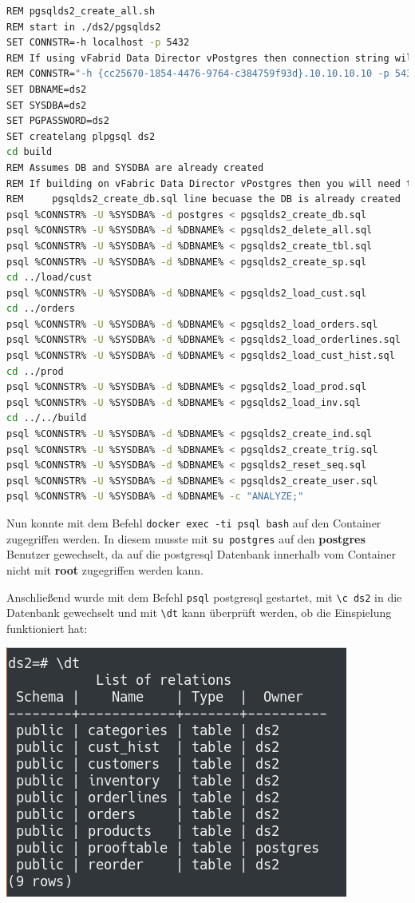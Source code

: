 \begin{lstlisting}[language=bash]
REM pgsqlds2_create_all.sh
REM start in ./ds2/pgsqlds2
SET CONNSTR=-h localhost -p 5432
REM If using vFabrid Data Director vPostgres then connection string will look like this
REM CONNSTR="-h {cc25670-1854-4476-9764-c384759f93d}.10.10.10.10 -p 5432"
SET DBNAME=ds2
SET SYSDBA=ds2
SET PGPASSWORD=ds2
SET createlang plpgsql ds2
cd build
REM Assumes DB and SYSDBA are already created
REM If building on vFabric Data Director vPostgres then you will need to comment out
REM     pgsqlds2_create_db.sql line becuase the DB is already created
psql %CONNSTR% -U %SYSDBA% -d postgres < pgsqlds2_create_db.sql
psql %CONNSTR% -U %SYSDBA% -d %DBNAME% < pgsqlds2_delete_all.sql
psql %CONNSTR% -U %SYSDBA% -d %DBNAME% < pgsqlds2_create_tbl.sql
psql %CONNSTR% -U %SYSDBA% -d %DBNAME% < pgsqlds2_create_sp.sql
cd ../load/cust
psql %CONNSTR% -U %SYSDBA% -d %DBNAME% < pgsqlds2_load_cust.sql
cd ../orders
psql %CONNSTR% -U %SYSDBA% -d %DBNAME% < pgsqlds2_load_orders.sql 
psql %CONNSTR% -U %SYSDBA% -d %DBNAME% < pgsqlds2_load_orderlines.sql 
psql %CONNSTR% -U %SYSDBA% -d %DBNAME% < pgsqlds2_load_cust_hist.sql 
cd ../prod
psql %CONNSTR% -U %SYSDBA% -d %DBNAME% < pgsqlds2_load_prod.sql 
psql %CONNSTR% -U %SYSDBA% -d %DBNAME% < pgsqlds2_load_inv.sql 
cd ../../build
psql %CONNSTR% -U %SYSDBA% -d %DBNAME% < pgsqlds2_create_ind.sql
psql %CONNSTR% -U %SYSDBA% -d %DBNAME% < pgsqlds2_create_trig.sql
psql %CONNSTR% -U %SYSDBA% -d %DBNAME% < pgsqlds2_reset_seq.sql
psql %CONNSTR% -U %SYSDBA% -d %DBNAME% < pgsqlds2_create_user.sql
psql %CONNSTR% -U %SYSDBA% -d %DBNAME% -c "ANALYZE;"
\end{lstlisting} 

Nun konnte mit dem Befehl \verb|docker exec -ti psql bash| auf den Container zugegriffen werden. In diesem musste mit \verb|su postgres| auf den \textbf{postgres} Benutzer gewechselt, da auf die postgresql Datenbank innerhalb vom Container nicht mit \textbf{root} zugegriffen werden kann. 

Anschließend wurde mit dem Befehl \verb|psql| postgresql gestartet, mit \verb|\c ds2| in die Datenbank gewechselt und mit \verb|\dt| kann überprüft werden, ob die Einspielung funktioniert hat:

\begin{minipage}{\linewidth}
	\centering
	\includegraphics[width=0.8\linewidth]{images/table1}
\end{minipage}
